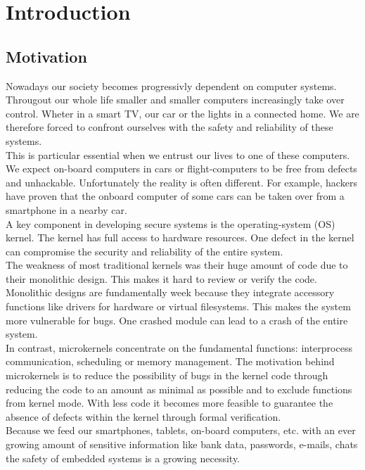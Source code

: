 \chapter{Introduction}
	\section{Motivation}
Nowadays our society becomes progressivly dependent on computer systems.\\ Througout our whole life smaller and smaller computers increasingly take over control. Wheter in a smart TV, our car or the lights in a connected home. We are therefore forced to confront ourselves with the safety and reliability of these systems. \\
This is particular essential when we entrust our lives to one of these computers. We expect on-board computers in cars or flight-computers to be free from defects and unhackable. Unfortunately the reality is often different. For example, hackers have proven that the onboard computer of some cars can be taken over from a smartphone in a nearby car. \\
A key component in developing secure systems is the operating-system (OS) kernel. The kernel has full access to hardware resources. One defect in the kernel can compromise the security and reliability of the entire system. \\
The weakness of most traditional kernels was their huge amount of code due to their monolithic design. This makes it hard to review or verify the code. Monolithic designs are fundamentally week because they integrate accessory functions like drivers for hardware or virtual filesystems. This makes the system more vulnerable for bugs. One crashed module can lead to a crash of the entire system. \\
In contrast, microkernels concentrate on the fundamental functions: interprocess communication, scheduling or memory management. The motivation behind microkernels is to reduce the  possibility of bugs in the kernel code through reducing the code to an amount as minimal as possible and to exclude functions from kernel mode. With less code it becomes more feasible to guarantee the absence of defects within the kernel through formal verification.\\
Because we feed our smartphones, tablets, on-board computers, etc. with an ever growing amount of sensitive information like bank data, passwords, e-mails, chats the safety of embedded systems is a growing necessity. \\
